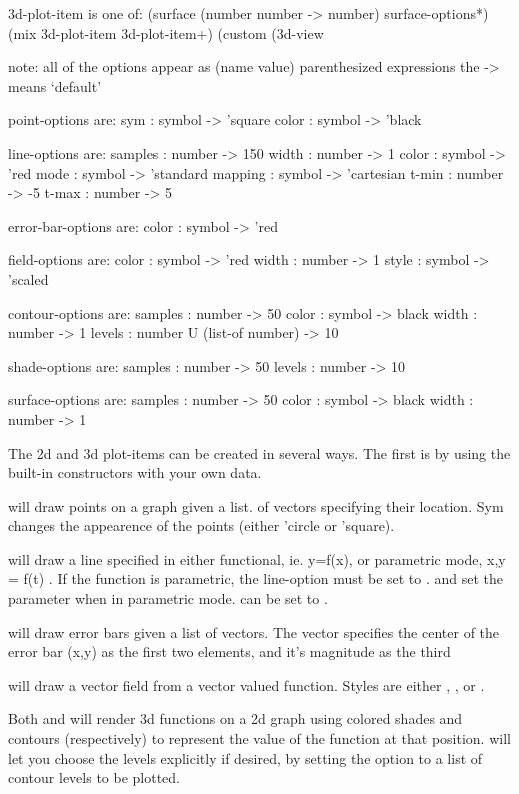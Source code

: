 \documentclass{article}
\begin{document}
{\begin{schemedisplay}
3d-plot-item is one of:
 (surface (number number -> number) surface-options*)
 (mix 3d-plot-item 3d-plot-item+)
 (custom (3d-view%

note: all of the options appear as (name value) parenthesized expressions
the -> means `default'

point-options are:
 sym : symbol -> 'square
 color : symbol -> 'black

line-options are:
 samples : number -> 150
 width : number -> 1
 color : symbol -> 'red
 mode : symbol -> 'standard
 mapping : symbol -> 'cartesian
 t-min : number -> -5
 t-max : number -> 5
 
error-bar-options are:
 color : symbol -> 'red

field-options are:
 color : symbol -> 'red
 width : number -> 1
 style : symbol -> 'scaled

contour-options are:
 samples : number -> 50
 color : symbol -> black
 width : number -> 1
 levels : number U (list-of number) -> 10

shade-options are:
 samples : number -> 50
 levels : number -> 10

surface-options are:
 samples : number -> 50
 color : symbol -> black
 width : number -> 1
\end{schemedisplay}



The 2d and 3d plot-items can be created in several ways. The first is by using the built-in constructors with your own data. 


 will draw points on a graph given a list. of vectors specifying their location. Sym changes the appearence of the points (either 'circle or 'square).


 will draw a line specified in either functional, ie. y=f(x), or  parametric mode, x,y = f(t) . If the function is parametric, the line-option  must be set to .  and  set the parameter when in parametric mode.  can be set to .


 will draw error bars given a list of vectors. The vector specifies the  center of the error bar (x,y) as the first two elements, and it's magnitude as the third


 will draw a vector field from a vector valued function. Styles are either , , or . 


Both  and  will render 3d functions on a 2d graph using colored shades and contours (respectively) to represent the value of the function at that position.  will let you choose the levels explicitly if desired, by setting the  option to a list of contour levels to be plotted.

}
\end{document}
